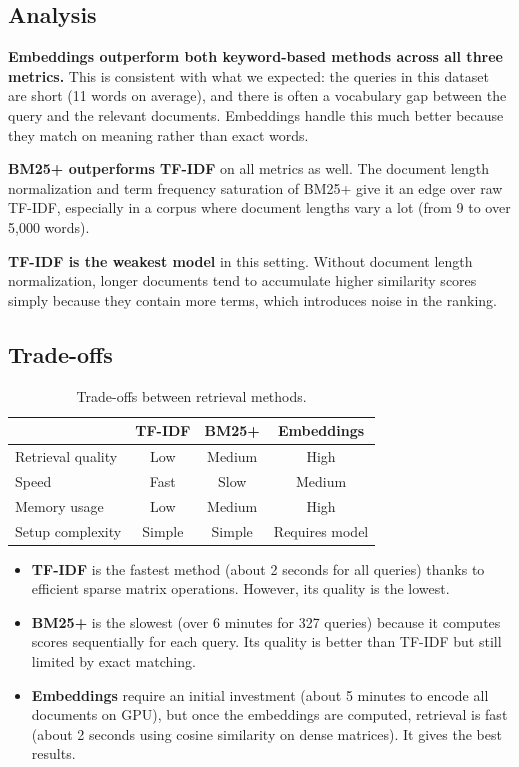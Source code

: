 \documentclass[12pt,a4paper]{article}
\begin{document}
\subsection{Analysis}

\textbf{Embeddings outperform both keyword-based methods across all three metrics.} This is consistent with what we expected: the queries in this dataset are short (11 words on average), and there is often a vocabulary gap between the query and the relevant documents. Embeddings handle this much better because they match on meaning rather than exact words.

\textbf{BM25+ outperforms TF-IDF} on all metrics as well. The document length normalization and term frequency saturation of BM25+ give it an edge over raw TF-IDF, especially in a corpus where document lengths vary a lot (from 9 to over 5,000 words).

\textbf{TF-IDF is the weakest model} in this setting. Without document length normalization, longer documents tend to accumulate higher similarity scores simply because they contain more terms, which introduces noise in the ranking.

\subsection{Trade-offs}

\begin{table}[H]
    \centering
    \begin{tabular}{lccc}
        \toprule
        & \textbf{TF-IDF} & \textbf{BM25+} & \textbf{Embeddings} \\
        \midrule
        Retrieval quality & Low    & Medium & High   \\
        Speed             & Fast   & Slow   & Medium \\
        Memory usage      & Low    & Medium & High   \\
        Setup complexity  & Simple & Simple & Requires model \\
        \bottomrule
    \end{tabular}
    \caption{Trade-offs between retrieval methods.}
    \label{tab:tradeoffs}
\end{table}

\begin{itemize}
    \item \textbf{TF-IDF} is the fastest method (about 2 seconds for all queries) thanks to efficient sparse matrix operations. However, its quality is the lowest.
    \item \textbf{BM25+} is the slowest (over 6 minutes for 327 queries) because it computes scores sequentially for each query. Its quality is better than TF-IDF but still limited by exact matching.
    \item \textbf{Embeddings} require an initial investment (about 5 minutes to encode all documents on GPU), but once the embeddings are computed, retrieval is fast (about 2 seconds using cosine similarity on dense matrices). It gives the best results.
\end{itemize}
\end{document}
